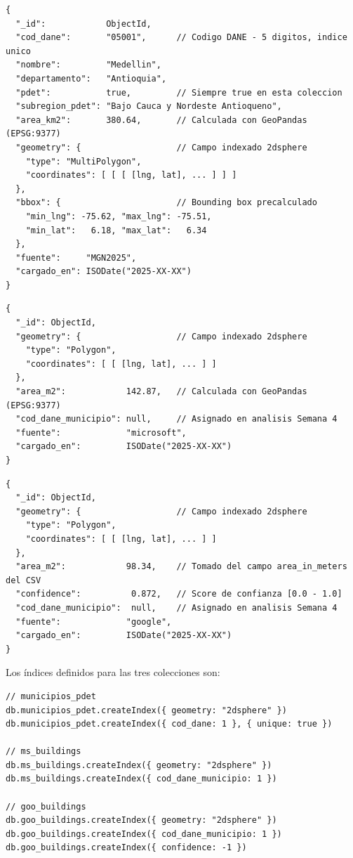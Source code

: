 \documentclass[12pt, a4paper]{report}
\begin{document}
\begin{lstlisting}[caption={Esquema --- Coleccion \texttt{municipios\_pdet}}]
{
  "_id":            ObjectId,
  "cod_dane":       "05001",      // Codigo DANE - 5 digitos, indice unico
  "nombre":         "Medellin",
  "departamento":   "Antioquia",
  "pdet":           true,         // Siempre true en esta coleccion
  "subregion_pdet": "Bajo Cauca y Nordeste Antioqueno",
  "area_km2":       380.64,       // Calculada con GeoPandas (EPSG:9377)
  "geometry": {                   // Campo indexado 2dsphere
    "type": "MultiPolygon",
    "coordinates": [ [ [ [lng, lat], ... ] ] ]
  },
  "bbox": {                       // Bounding box precalculado
    "min_lng": -75.62, "max_lng": -75.51,
    "min_lat":   6.18, "max_lat":   6.34
  },
  "fuente":     "MGN2025",
  "cargado_en": ISODate("2025-XX-XX")
}
\end{lstlisting}

\begin{lstlisting}[caption={Esquema --- Coleccion \texttt{ms\_buildings}}]
{
  "_id": ObjectId,
  "geometry": {                   // Campo indexado 2dsphere
    "type": "Polygon",
    "coordinates": [ [ [lng, lat], ... ] ]
  },
  "area_m2":            142.87,   // Calculada con GeoPandas (EPSG:9377)
  "cod_dane_municipio": null,     // Asignado en analisis Semana 4
  "fuente":             "microsoft",
  "cargado_en":         ISODate("2025-XX-XX")
}
\end{lstlisting}

\begin{lstlisting}[caption={Esquema --- Coleccion \texttt{goo\_buildings}}]
{
  "_id": ObjectId,
  "geometry": {                   // Campo indexado 2dsphere
    "type": "Polygon",
    "coordinates": [ [ [lng, lat], ... ] ]
  },
  "area_m2":            98.34,    // Tomado del campo area_in_meters del CSV
  "confidence":          0.872,   // Score de confianza [0.0 - 1.0]
  "cod_dane_municipio":  null,    // Asignado en analisis Semana 4
  "fuente":             "google",
  "cargado_en":         ISODate("2025-XX-XX")
}
\end{lstlisting}

Los índices definidos para las tres colecciones son:

\begin{lstlisting}[caption={Indices definidos en \texttt{upme\_solar\_db}}]
// municipios_pdet
db.municipios_pdet.createIndex({ geometry: "2dsphere" })
db.municipios_pdet.createIndex({ cod_dane: 1 }, { unique: true })

// ms_buildings
db.ms_buildings.createIndex({ geometry: "2dsphere" })
db.ms_buildings.createIndex({ cod_dane_municipio: 1 })

// goo_buildings
db.goo_buildings.createIndex({ geometry: "2dsphere" })
db.goo_buildings.createIndex({ cod_dane_municipio: 1 })
db.goo_buildings.createIndex({ confidence: -1 })
\end{lstlisting}
\end{document}
